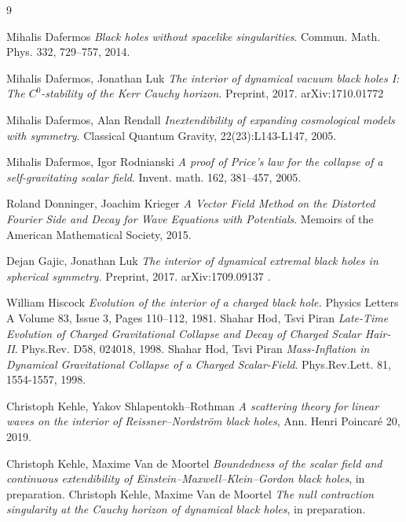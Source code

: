 \documentclass[10pt,a4paper]{article}
\theoremstyle{plain}
\theoremstyle{remark}
\theoremstyle{definition}
\theoremstyle{plain}
\theoremstyle{remark}
\theoremstyle{definition}
\numberwithin{equation}{section}
\begin{document}
\begin{thebibliography}{9}
	
	Mihalis Dafermos
	\emph{Black holes without spacelike singularities}.
	Commun. Math. Phys. 332, 729–757, 2014.
	
	Mihalis Dafermos, Jonathan Luk  \emph{The interior of dynamical vacuum black holes I: The $C^0$-stability of the Kerr Cauchy horizon}.
	Preprint, 2017. arXiv:1710.01772
	
	Mihalis Dafermos, Alan Rendall  \emph{Inextendibility of expanding cosmological models with symmetry}.  Classical Quantum
	Gravity, 22(23):L143-L147, 2005.
	
	Mihalis Dafermos, Igor Rodnianski
	\emph{A proof of Price's law for the collapse of
		a self-gravitating scalar field}.
	Invent. math. 162, 381–457, 2005.
	
	
	
	
	
	
	Roland Donninger, Joachim Krieger \emph{A Vector Field Method on the Distorted Fourier Side and Decay for Wave Equations with Potentials}.
	Memoirs of the American Mathematical Society, 2015.
	
	
	
	
	
	
	
	
	
	Dejan Gajic, Jonathan Luk \emph{The interior of dynamical extremal black holes in
		spherical symmetry.}
	Preprint, 2017. arXiv:1709.09137 .
	
	
	
	
	
	
	
	William Hiscock \emph{Evolution of the interior of a charged black hole.}
	Physics Letters A
	Volume 83, Issue 3, Pages 110–112, 1981.
	Shahar Hod, Tsvi Piran
	\emph{Late-Time Evolution of Charged Gravitational Collapse and Decay of Charged Scalar Hair-II}.
	Phys.Rev. D58, 024018, 1998.
	Shahar Hod, Tsvi Piran
	\emph{Mass-Inflation in Dynamical Gravitational Collapse of a Charged Scalar-Field}.
	Phys.Rev.Lett. 81, 1554-1557, 1998.
	
	
	
	 Christoph Kehle, Yakov Shlapentokh--Rothman \emph{A scattering theory for linear waves on the interior of Reissner–Nordström black holes}, Ann. Henri Poincaré 20, 2019. 
	
	 Christoph Kehle,  Maxime Van de Moortel \emph{Boundedness of the scalar field and continuous extendibility of Einstein–Maxwell–Klein–Gordon black holes}, in preparation.
	 Christoph Kehle,  Maxime Van de Moortel \emph{The null contraction singularity at the Cauchy horizon of dynamical black holes}, in preparation.
	

\end{thebibliography}
\end{document}
